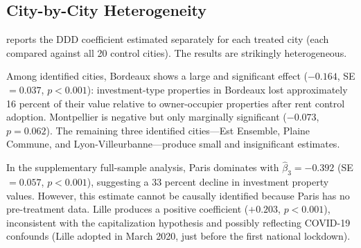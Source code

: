 \documentclass[12pt]{article}
\begin{document}
\subsection{City-by-City Heterogeneity}

 reports the DDD coefficient estimated separately for each treated city (each compared against all 20 control cities). The results are strikingly heterogeneous.

Among identified cities, Bordeaux shows a large and significant effect ($-0.164$, SE $= 0.037$, $p < 0.001$): investment-type properties in Bordeaux lost approximately 16 percent of their value relative to owner-occupier properties after rent control adoption. Montpellier is negative but only marginally significant ($-0.073$, $p = 0.062$). The remaining three identified cities---Est Ensemble, Plaine Commune, and Lyon-Villeurbanne---produce small and insignificant estimates.

In the supplementary full-sample analysis, Paris dominates with $\hat{\beta}_3 = -0.392$ (SE $= 0.057$, $p < 0.001$), suggesting a 33 percent decline in investment property values. However, this estimate cannot be causally identified because Paris has no pre-treatment data. Lille produces a positive coefficient ($+0.203$, $p < 0.001$), inconsistent with the capitalization hypothesis and possibly reflecting COVID-19 confounds (Lille adopted in March 2020, just before the first national lockdown).
\end{document}
